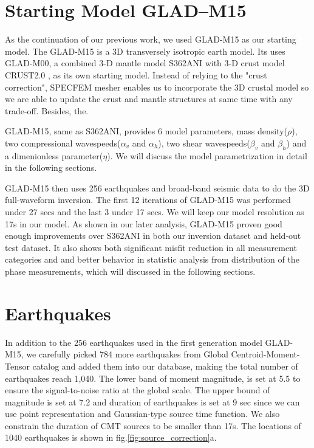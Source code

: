 \documentclass[extra,mreferee]{gji}
\begin{document}
\section{Starting Model GLAD--M15}

As the continuation of our previous work, we used GLAD-M15 as our
starting model\citep{bozdaug2016global}.
The GLAD-M15 is a 3D transversely isotropic earth model. Its uses
GLAD-M00, a combined 3-D mantle model S362ANI \citep{kustowski2008anisotropic}
with 3-D crust model CRUST2.0 \citep{bassin2000current}, as its own starting model.
Instead of relying to the "crust correction", SPECFEM mesher enables us to incorporate
the 3D crustal model so we are able to update the crust and mantle structures at same
time with any trade-off. Besides, the.

GLAD-M15, same as  S362ANI, provides 6 model parameters, mass density($\rho$), two compressional
wavespeeds($\alpha_v$ and $\alpha_h$), two shear wavespeeds($\beta_v$
and $\beta_h$) and a dimenionless parameter($\eta$). We will discuss
the model parametrization in detail in the following sections.

GLAD-M15 then uses 256 earthquakes and broad-band seismic data to do the 3D full-waveform
inversion\citep{bozdaug2016global}. The first 12 iterations of GLAD-M15 was
performed under 27 secs and the last 3 under 17 secs. We will keep our model
resolution as 17s in our model. As shown in our later analysis,
GLAD-M15 proven good enough improvements over S362ANI in both our inversion
dataset and held-out test dataset. It also shows both significant misfit reduction
in all measurement categories and and better behavior in statistic analysis from distribution
of the phase measurements, which will discussed in the following sections.

\section{Earthquakes}
In addition to the 256 earthquakes used in the first generation model GLAD-M15, we
carefully picked 784 more earthquakes from Global Centroid-Moment-Tensor catalog\citep{}
and added them into our database, making the total number of earthquakes reach 1,040.
The lower band of moment magnitude, is set at 5.5 to ensure the signal-to-noise ratio at
the global scale. The upper bound of magnitude is set at 7.2 and duration of earthquakes
is set at 9 sec since we can use point representation and Gaussian-type source
time function.
We also constrain the duration of CMT sources to be smaller than 17s.
The locations of 1040 earthquakes is shown in fig.\ref{fig:source_correction}a.
\end{document}
